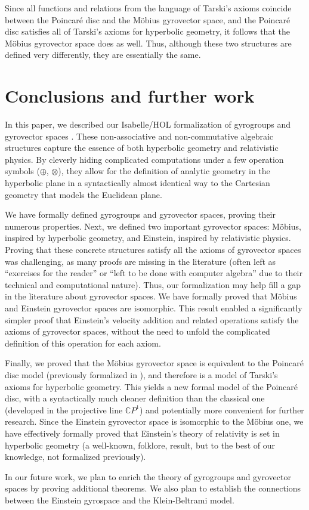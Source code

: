 \documentclass[a4paper]{article}
\theoremstyle{definition}
\begin{document}
Since all functions and relations from the language of Tarski's axioms
coincide between the Poincar\'e disc and the M\"obius gyrovector
space, and the Poincar\'e disc satisfies all of Tarski's axioms for
hyperbolic geometry, it follows that the M\"obius gyrovector space
does as well. Thus, although these two structures are defined very
differently, they are essentially the same.

\section{Conclusions and further work}\label{sec:conclusions}

In this paper, we described our Isabelle/HOL formalization of
gyrogroups and gyrovector spaces \cite{ungar-analytic}. These
non-associative and non-commutative algebraic structures capture the
essence of both hyperbolic geometry and relativistic physics. By
cleverly hiding complicated computations under a few operation symbols
($\oplus$, $\otimes$), they allow for the definition of analytic
geometry in the hyperbolic plane in a syntactically almost identical
way to the Cartesian geometry that models the Euclidean plane.

We have formally defined gyrogroups and gyrovector spaces, proving
their numerous properties. Next, we defined two important gyrovector
spaces: M\"obius, inspired by hyperbolic geometry, and Einstein,
inspired by relativistic physics. Proving that these concrete
structures satisfy all the axioms of gyrovector spaces was
challenging, as many proofs are missing in the literature (often left
as ``exercises for the reader'' or ``left to be done with computer
algebra'' due to their technical and computational nature). Thus, our
formalization may help fill a gap in the literature about gyrovector
spaces. We have formally proved that M\"obius and Einstein gyrovector
spaces are isomorphic. This result enabled a significantly simpler
proof that Einstein's velocity addition and related operations satisfy
the axioms of gyrovector spaces, without the need to unfold the
complicated definition of this operation for each axiom.

Finally, we proved that the M\"obius gyrovector space is equivalent to
the Poincar\'e disc model (previously formalized in
\cite{amai-poincare}), and therefore is a model of Tarski's axioms for
hyperbolic geometry. This yields a new formal model of the Poincar\'e
disc, with a syntactically much cleaner definition than the classical
one (developed in the projective line $\mathbb{C}P^1$) and potentially
more convenient for further research. Since the Einstein gyrovector
space is isomorphic to the M\"obius one, we have effectively formally
proved that Einstein's theory of relativity is set in hyperbolic
geometry (a well-known, folklore, result, but to the best of our
knowledge, not formalized previously).

In our future work, we plan to enrich the theory of gyrogroups and
gyrovector spaces by proving additional theorems. We also plan to
establish the connections between the Einstein gyrospace and the
Klein-Beltrami model.


\end{document}
